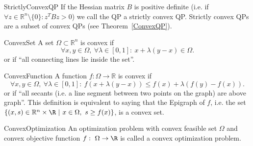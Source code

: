 \begin{theo}{StrictlyConvexQP}
    If the Hessian matrix $B$ is positive definite (i\@.e\@. if $\forall z \in \mathbb{R}^n \setminus \{0\}: z^T Bz > 0$) we call the QP a strictly convex QP\@. Strictly convex QPs are a subset of convex QPs (see Theorem~\ref{ConvexQP}).
\end{theo}

\begin{theo}{ConvexSet}
    A set $\Omega \subset \mathbb{R}^n$ is convex if 
    \begin{equation*}
        \forall x,y \in \Omega, \ \forall \lambda \in [0,1]: \ x + \lambda(y - x) \in \Omega.
    \end{equation*}
    or if ``all connecting lines lie inside the set''.

\end{theo}

\begin{theo}{ConvexFunction}
    A function $f: \Omega \rightarrow \mathbb{R}$ is convex if 
    \begin{equation*}
        \forall x,y \in \Omega, \ \forall \lambda \in [0,1]: \ f(x + \lambda(y - x)) \leq f(x) + \lambda(f(y) - f(x)).
    \end{equation*}
    or if ``all secants (i\@.e\@. a line segment between two points on the graph) are above graph''. This definition is equivalent to saying that the Epigraph of $f$, i\@.e\@. the set $\{(x,s) \in \mathbb{R}^n \times \R \ | \ x \in \Omega, \ s \geq f(x) \}$, is a convex set.
    \vspace*{-0.1cm}
\end{theo}

\begin{theo}{ConvexOptimization}
    An optimization problem with convex feasible set $\Omega$ and convex objective function $f: \ \Omega \rightarrow \R$ is called a convex optimization problem. 
\end{theo}

